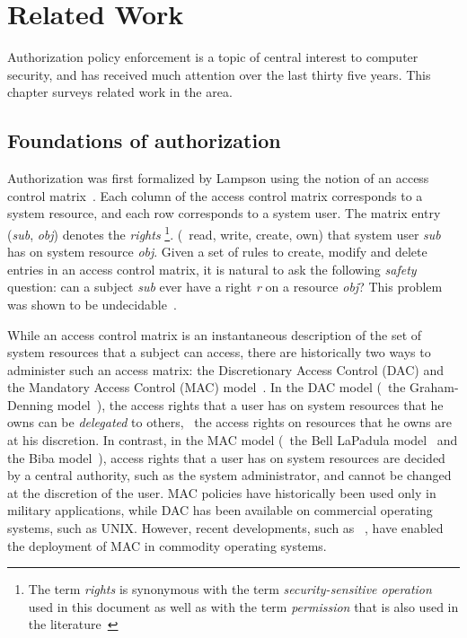 \chapter{Related Work}
\label{chapter:relatedwork}

Authorization policy enforcement is a topic of central interest to computer
security, and has received much attention over the last thirty five years.
This chapter surveys related work in the area.


\section{Foundations of authorization}
\label{chapter:relatedwork:foundations}

Authorization was first formalized by Lampson using the notion of an access
control matrix~\cite{l71}. Each column of the access control matrix corresponds
to a system resource, and each row corresponds to a system user. The matrix
entry (\textit{sub}, \textit{obj}) denotes the \textit{rights} \footnote{The
term \textit{rights} is synonymous with the term \textit{security-sensitive
operation} used in this document as well as with the term \textit{permission}
that is also used in the literature~\cite{ghr+05,jsz03,s05b}}.  (\eg\ read,
write, create, own) that system user \textit{sub} has on system resource
\textit{obj}.  Given a set of rules to create, modify and delete entries in an
access control matrix, it is natural to ask the following \textit{safety}
question: can a subject \textit{sub} ever have a right \textit{r} on a resource
\textit{obj}? This problem was shown to be undecidable~\cite{hru76}. 

While an access control matrix is an instantaneous description of the set of
system resources that a subject can access, there are historically two ways to
administer such an access matrix: the Discretionary Access Control (DAC) 
and the Mandatory Access Control (MAC) model~\cite{tcsec}. In the DAC model
(\eg~the Graham-Denning model~\cite{gd72}), the access rights that a user has
on system resources that he owns can be \textit{delegated} to others, \ie~the
access rights on resources that he owns are at his discretion. In contrast, in
the MAC model (\eg~the Bell LaPadula model~\cite{bl76} and the Biba
model~\cite{b77}), access rights that a user has on system resources are
decided by a central authority, such as the system administrator, and cannot be
changed at the discretion of the user. MAC policies have historically been used
only in military applications, while DAC has been available on commercial
operating systems, such as UNIX. However, recent developments, such as
\selinux~\cite{ls01a,ls01b}, have enabled the deployment of MAC in commodity
operating systems. 

